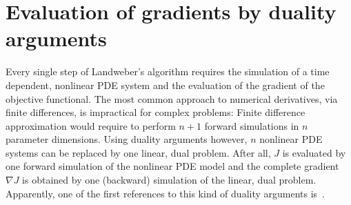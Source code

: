 \section{Evaluation of gradients by duality arguments}

Every single step of Landweber's algorithm requires the simulation of
a time dependent, nonlinear PDE system and the evaluation of the
gradient of the objective functional.  The most common approach to
numerical derivatives, via finite differences, is impractical for
complex problems: Finite difference approximation would require to
perform $n+1$ forward simulations in $n$ parameter dimensions.  Using
duality arguments however, $n$ nonlinear PDE systems can be replaced
by one linear, dual problem.  After all, $J$ is evaluated by one
forward simulation of the nonlinear PDE model and the complete
gradient $\nabla J$ is obtained by one (backward) simulation of the
linear, dual problem.  Apparently, one of the first references to this
kind of duality arguments is~\citet{ChaventLemmonier1974}.

